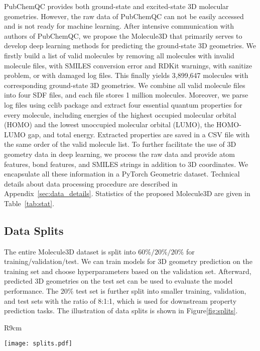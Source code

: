 \documentclass{article}
\begin{document}
PubChemQC provides both ground-state and excited-state 3D molecular geometries. However, the raw data of PubChemQC can not be easily accessed and is not ready for machine learning. After intensive communication with authors of PubChemQC, we propose the Molecule3D that primarily serves to develop deep learning methods for predicting the ground-state 3D geometries. We firstly build a list of valid molecules by removing all molecules with invalid molecule files, with SMILES conversion error and RDKit warnings, with sanitize problem, or with damaged log files. This finally yields 3,899,647 molecules with corresponding ground-state 3D geometries. We combine all valid molecule files into four SDF files, and each file stores 1 million molecules. Moreover, we parse log files using cclib package \cite{o2008cclib} and extract four essential quantum properties for every molecule, including energies of the highest occupied molecular orbital (HOMO) and the lowest unoccupied molecular orbital (LUMO), the HOMO-LUMO gap, and total energy. Extracted properties are saved in a CSV file with the same order of the valid molecule list. To further facilitate the use of 3D geometry data in deep learning, we process the raw data and provide atom features, bond features, and SMILES strings in addition to 3D coordinates. We encapsulate all these information in a PyTorch Geometric dataset. Technical details about data processing procedure are described in Appendix~\ref{sec:data_details}. Statistics of the proposed Molecule3D are given in Table~\ref{tab:stat}.



\subsection{Data Splits}\label{subsec: splits}


The entire Molecule3D dataset is split into $60\%/20\%/20\%$ for training/validation/test. We can train models for 3D geometry prediction on the training set and choose hyperparameters based on the validation set. Afterward, predicted 3D geometries on the test set can be used to evaluate the model performance. The 20\% test set is further split into smaller training, validation, and test sets with the ratio of 8:1:1, which is used for downstream property prediction tasks. The illustration of data splits is shown in Figure\ref{fig:splits}.

\begin{wrapfigure}[12]{R}{9cm}\vspace{-0.5cm}
  \begin{center}
    \texttt{[image: splits.pdf]}
  \end{center}
  \caption{Data splits. For both random and scaffold split, 3D geometries prediction task involves the entire dataset, while downstream property prediction task uses only 20\% of data.}
  \label{fig:splits}
\end{wrapfigure}
\end{document}
